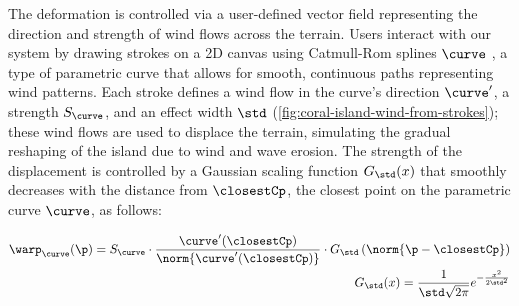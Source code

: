 






The deformation is controlled via a user-defined vector field representing the direction and strength of wind flows across the terrain. Users interact with our system by drawing strokes on a 2D canvas using Catmull-Rom splines $\curve$ \cite{Catmull1974}, a type of parametric curve that allows for smooth, continuous paths representing wind patterns. Each stroke defines a wind flow in the curve's direction $\curve'$, a strength $S_\curve$, and an effect width $\std$ (\cref{fig:coral-island-wind-from-strokes}); these wind flows are used to displace the terrain, simulating the gradual reshaping of the island due to wind and wave erosion. The strength of the displacement is controlled by a Gaussian scaling function $G_\std(x)$ that smoothly decreases with the distance from $\closestCp$, the closest point on the parametric curve $\curve$, as follows:

\begin{align}
    \warp_\curve(\p) = S_\curve \cdot \frac{\curve'(\closestCp)}{\norm{\curve'(\closestCp)} } \cdot G_\std\left(\norm{\p - \closestCp} \right) \\
    G_\std(x) = \frac{1}{\std \sqrt{2\pi}} e^{-\frac{x^2}{2 \std^2}}
\end{align}

